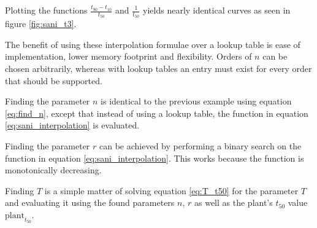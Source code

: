 Plotting  the  functions $\frac{t_{90}-t_{10}}{t_{50}}$  and  $\frac{1}{t_{50}}$
yields  nearly  identical   curves   as   seen   in   figure  \ref{fig:sani_t3}.

The benefit of using these interpolation formulae over a lookup table is ease of
implementation, lower memory footprint and  flexibility.  Orders  of  $n$ can be
chosen  arbitrarily,  whereas  with lookup tables an entry must exist for  every
order that should be supported.

Finding the parameter $n$ is identical to the previous  example  using  equation
\ref{eq:find_n}, except that instead of  using  a  lookup table, the function in
equation \ref{eq:sani_interpolation} is evaluated.

Finding the parameter $r$ can be achieved by performing a binary search  on  the
function  in  equation  \ref{eq:sani_interpolation}.  This   works  because  the
function is monotonically decreasing.

Finding $T$ is  a  simple  matter  of  solving  equation  \ref{eq:T_t50} for the
parameter $T$ and  evaluating  it using the found parameters $n$, $r$ as well as
the plant's $t_{50}$ value $\textrm{plant}_{t_{50}}$.

